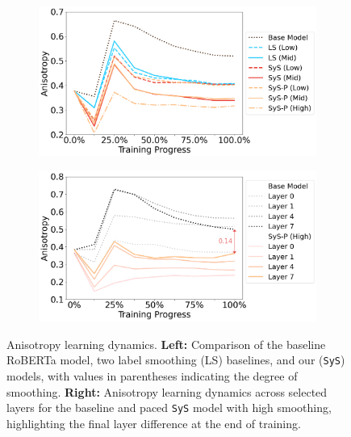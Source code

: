 \begin{figure}[ht!]
    \centering
    \begin{subfigure}[b]{0.49\textwidth}
        \centering
        \includegraphics[width=\textwidth]{chapters/syntatic-smoothing/figures/anisotropy-learning-dynamics.png}
        \label{fig:anisotropy-learing-dynamics}
    \end{subfigure}
    \hfill
    \begin{subfigure}[b]{0.49\textwidth}
        \centering
        \includegraphics[width=\textwidth]{chapters/syntatic-smoothing/figures/anisotropy-layers.png}
        \label{fig:anisotropy-layers}
    \end{subfigure}
    \caption{Anisotropy learning dynamics. \textbf{Left:} Comparison of the baseline RoBERTa model, two label smoothing (LS) baselines, and our \smoothing (\texttt{SyS}) models, with values in parentheses indicating the degree of smoothing. \textbf{Right:} Anisotropy learning dynamics across selected layers for the baseline and paced \texttt{SyS} model with high smoothing, highlighting the final layer difference at the end of training.}
    \label{fig:anisotropy-combined}
\end{figure}


